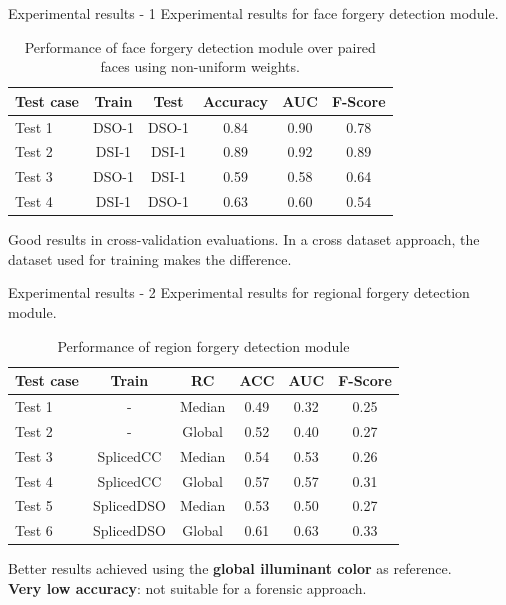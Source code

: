 \begin{tframe}{Experimental results - 1}
Experimental results for face forgery detection module.
\begin{footnotesize}
\begin{table}[h!]
\centering
\begin{tabular}{l c c c c c} 
\hline \hline 
\textbf{Test case} & \textbf{Train} & \textbf{Test} & \textbf{Accuracy} & \textbf{AUC} &\textbf{ F-Score} \\ [0.5ex]
\hline
Test 1 & DSO-1 & DSO-1 &	0.84 & 0.90	& 0.78\\
Test 2 & DSI-1 & DSI-1 &	0.89 & 0.92 & 0.89\\
Test 3 &	DSO-1 &	DSI-1 &	0.59 & 0.58 & 0.64\\
Test 4 &	DSI-1 & DSO-1 & 0.63 & 0.60 & 0.54\\ [1ex]
\hline
\end{tabular}
\caption{Performance of face forgery detection module over paired faces using non-uniform weights.}
\end{table}
\end{footnotesize}
\vspace{0.2cm}
Good results in cross-validation evaluations. In a cross dataset approach, the dataset used for training makes the difference.
\end{tframe}


\begin{tframe}{Experimental results - 2}
Experimental results for regional forgery detection module. 
\begin{footnotesize}
\begin{table}[h!]
\centering
\begin{tabular}{l c c c c c} 
\hline \hline 
\textbf{Test case} & \textbf{Train} & \textbf{RC} & \textbf{ACC} & \textbf{AUC} &\textbf{ F-Score} \\ [0.5ex]
\hline
Test 1 & - & Median & 0.49 & 0.32 & 0.25\\
Test 2 & - & Global & 0.52 & 0.40 & 0.27\\
Test 3 & SplicedCC & Median & 0.54 & 0.53 & 0.26\\
Test 4 & SplicedCC & Global & 0.57 & 0.57 & 0.31\\
Test 5 &	 SplicedDSO & Median & 0.53 & 0.50 & 0.27\\
Test 6 &	 SplicedDSO & Global & 0.61 & 0.63 & 0.33\\ [1ex]
\hline
\end{tabular}
\caption{Performance of region forgery detection module}
\label{table:performanceregionaldet}
\end{table}
\end{footnotesize}
Better results achieved using the\textbf{ global illuminant color }as reference.\\

\vspace{0.2cm}
\textbf{Very low accuracy}: not suitable for a forensic approach.
\end{tframe}

